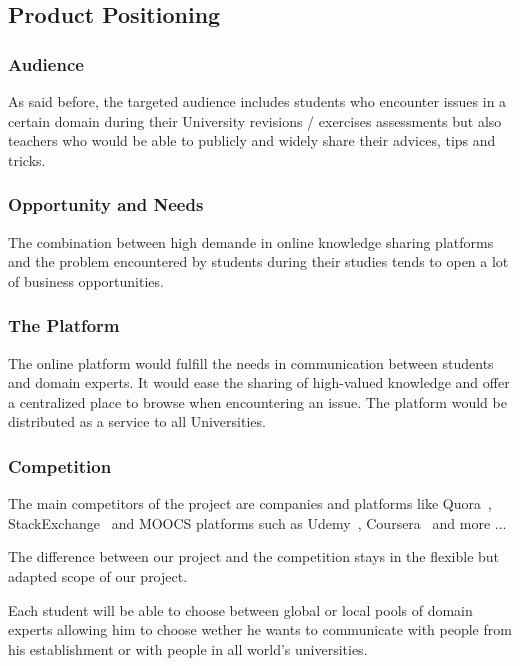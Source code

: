 \documentclass[12pt,a4paper,oneside, titlepage]{article}
\begin{document}
         
		\subsection{Product Positioning}
		
		\subsubsection{Audience}
		As said before, the targeted audience includes students who encounter issues in a certain domain during 
		their University revisions / exercises assessments but also teachers who would be able to publicly and 
		widely share their advices, tips and tricks.
		
	    \subsubsection{Opportunity and Needs}
		The combination between high demande in online knowledge sharing platforms and the problem encountered 
		by students during their studies tends to open a lot of business opportunities.
		
	    \subsubsection{The Platform}
		The online platform would fulfill the needs in communication between students and domain experts. It 
		would ease the sharing of high-valued knowledge and offer a centralized place to browse when 
		encountering an issue. The platform would be distributed as a service to all Universities.
		
	    \subsubsection{Competition}
		The main competitors of the project are companies and platforms like Quora~\cite{quoraWebsite}, 
		StackExchange~\cite{stackExchangeWebsite} and MOOCS platforms such as Udemy~\cite{udemyWebsite}, 
		Coursera~\cite{courseraWebsite} and more ... \newline
		
		The difference between our project and the competition stays in the flexible but adapted scope of our 
		project. \newline 
		
		Each student will be able to choose between global or local pools of domain experts allowing him to 
		choose wether he wants to communicate with people from his establishment or with people in all world's 
		universities. \newline
		
\end{document}

